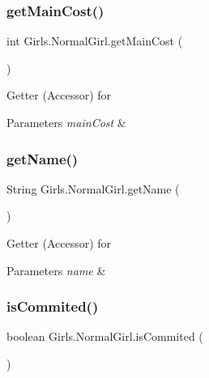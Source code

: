 \subsubsection{\texorpdfstring{get\+Main\+Cost()}{getMainCost()}}
{\footnotesize\ttfamily int Girls.\+Normal\+Girl.\+get\+Main\+Cost (\begin{DoxyParamCaption}{ }\end{DoxyParamCaption})\hspace{0.3cm}{\ttfamily [inline]}}

Getter (Accessor) for 
\begin{DoxyParams}{Parameters}
{\em main\+Cost} & \\
\hline
\end{DoxyParams}
\mbox{\label{class_girls_1_1_normal_girl_a56b9d41aa148e7b2fc0135af7570331b}} 
\subsubsection{\texorpdfstring{get\+Name()}{getName()}}
{\footnotesize\ttfamily String Girls.\+Normal\+Girl.\+get\+Name (\begin{DoxyParamCaption}{ }\end{DoxyParamCaption})\hspace{0.3cm}{\ttfamily [inline]}}

Getter (Accessor) for 
\begin{DoxyParams}{Parameters}
{\em name} & \\
\hline
\end{DoxyParams}
\mbox{\label{class_girls_1_1_normal_girl_a97b95cb90e4763f1afe2bb7db93cd62f}} 
\subsubsection{\texorpdfstring{is\+Commited()}{isCommited()}}
{\footnotesize\ttfamily boolean Girls.\+Normal\+Girl.\+is\+Commited (\begin{DoxyParamCaption}{ }\end{DoxyParamCaption})\hspace{0.3cm}{\ttfamily [inline]}}

